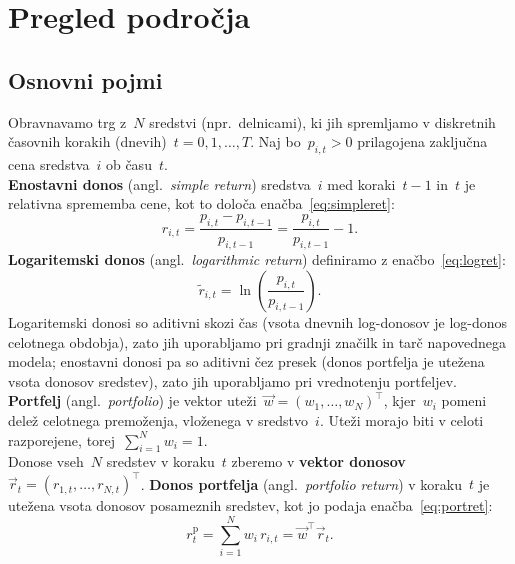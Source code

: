 \chapter{Pregled področja}
\label{ch:ozadje}

\section{Osnovni pojmi}
\label{sec:osnovnipojmi}

Obravnavamo trg z~$N$ sredstvi (npr.\ delnicami), ki jih spremljamo v diskretnih časovnih korakih (dnevih)~$t=0,1,\dots,T$. Naj bo~$p_{i,t}>0$ prilagojena zaključna cena sredstva~$i$ ob času~$t$.\\

\noindent\textbf{Enostavni donos} (angl.\ \emph{simple return}) sredstva~$i$ med koraki~$t-1$ in~$t$ je relativna sprememba cene, kot to določa enačba~\eqref{eq:simpleret}:
\begin{equation}
\label{eq:simpleret}
  r_{i,t} = \frac{p_{i,t}-p_{i,t-1}}{p_{i,t-1}} = \frac{p_{i,t}}{p_{i,t-1}}-1.
\end{equation}
\textbf{Logaritemski donos} (angl.\ \emph{logarithmic return}) definiramo z enačbo~\eqref{eq:logret}:
\begin{equation}
\label{eq:logret}
  \tilde r_{i,t} = \ln\left(\frac{p_{i,t}}{p_{i,t-1}}\right).
\end{equation}
Logaritemski donosi so aditivni skozi čas (vsota dnevnih log-donosov je log-donos celotnega obdobja), zato jih uporabljamo pri gradnji značilk in tarč napovednega modela; enostavni donosi pa so aditivni čez presek (donos portfelja je utežena vsota donosov sredstev), zato jih uporabljamo pri vrednotenju portfeljev.\\

\noindent\textbf{Portfelj} (angl.\ \emph{portfolio}) je vektor uteži~$\vec{w}=(w_1,\dots,w_N)^{\!\top}$, kjer~$w_i$ pomeni delež celotnega premoženja, vloženega v sredstvo~$i$. Uteži morajo biti v celoti razporejene, torej~$\sum_{i=1}^N w_i = 1$.\\

Donose vseh~$N$ sredstev v koraku~$t$ zberemo v \textbf{vektor donosov}~$\vec{r}_t=(r_{1,t},\dots,r_{N,t})^{\!\top}$. \noindent\textbf{Donos portfelja} (angl.\ \emph{portfolio return}) v koraku~$t$ je utežena vsota donosov posameznih sredstev, kot jo podaja enačba~\eqref{eq:portret}:
\begin{equation}
\label{eq:portret}
  r^{\text{p}}_t = \sum_{i=1}^N w_i\, r_{i,t} = \vec{w}^{\!\top}\vec{r}_t .
\end{equation}\\

